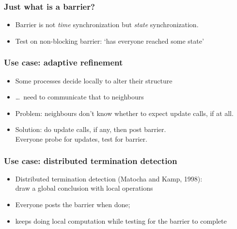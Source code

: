 \begin{mpithree}
\begin{exerciseframe}[procgridnonblock]
  \hyperlink{exprocgrid}{}

  
\end{exerciseframe}


\begin{frame}[containsverbatim]\frametitle{Just what is a barrier?}
  \begin{itemize}
  \item Barrier is not \emph{time} synchronization but \emph{state}
    synchronization.
  \item Test on non-blocking barrier: `has everyone reached some
    state'
  \end{itemize}
\end{frame}

\begin{frame}[containsverbatim]\frametitle{Use case: adaptive refinement}
  \begin{itemize}
  \item Some processes decide locally to alter their structure
  \item \ldots~need to communicate that to neighbours
  \item Problem: neighbours don't know whether to expect update calls,
    if at all.
  \item Solution: do update calls, if any, then post barrier.\\
    Everyone probe for updates, test for barrier.    
  \end{itemize}
\end{frame}

\begin{frame}\frametitle{Use case: distributed termination detection}
  \begin{itemize}
  \item Distributed termination detection (Matocha and Kamp, 1998):\\
    draw a global conclusion with local operations
  \item Everyone posts the barrier when done;
  \item keeps doing local computation while testing for the barrier to
    complete
  \end{itemize}
\end{frame}


\begin{frame}[containsverbatim]\frametitle{}
\end{frame}


\end{mpithree}
